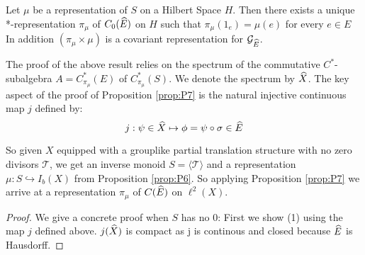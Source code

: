 \begin{corollary}
\begin{proposition}\label{prop:P7} 
Let $\mu$ be a representation of $S$ on a Hilbert Space $H$. Then there exists a unique *-representation $\pi_{\mu}$ of $C_{0}(\widehat{E})$ on $H$ such that $\pi_{\mu}(1_{e})=\mu(e)$ for every $e \in E$ In addition $(\pi_{\mu} \times \mu)$ is a covariant representation for $\mathcal{G}_{\widehat{E}}$. 
\end{proposition}

The proof of the above result relies on the spectrum of the commutative $C^{*}$-subalgebra $A=C^{*}_{\pi_{\mu}}(E)$ of $C^{*}_{\pi_{\mu}}(S)$. We denote the spectrum by $\widehat{X}$. The key aspect of the proof of Proposition \ref{prop:P7} is the natural injective continuous map $j$ defined by: 
\begin{equation*}
j: \psi \in \widehat{X} \mapsto \phi = \psi \circ \sigma \in \widehat{E}
\end{equation*}

So given $X$ equipped with a grouplike partial translation structure with no zero divisors $\mathcal{T}$, we get an inverse monoid $S=\langle \mathcal{T} \rangle$ and a representation $\mu: S \hookrightarrow I_{b}(X)$ from Proposition \ref{prop:P6}. So applying Proposition \ref{prop:P7} we arrive at a representation $\pi_{\mu}$ of $C(\widehat{E})$ on $\ell^{2}(X)$. 

\begin{proof}
We give a concrete proof when $S$ has no 0: First we show (1) using the map $j$ defined above. $j(\widehat{X})$ is compact as j is continous and closed because $\widehat{E}$ is Hausdorff.


\end{proof}
\end{corollary}
